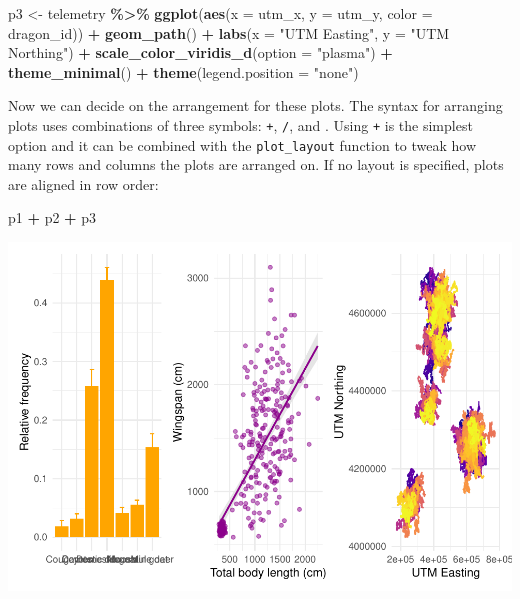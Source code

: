\documentclass[
]{book}
\newenvironment{Shaded}{\begin{snugshade}}{\end{snugshade}}
\newcommand{\AttributeTok}[1]{\textcolor[rgb]{0.13,0.29,0.53}{#1}}
\newcommand{\FunctionTok}[1]{\textcolor[rgb]{0.13,0.29,0.53}{\textbf{#1}}}
\newcommand{\NormalTok}[1]{#1}
\newcommand{\OtherTok}[1]{\textcolor[rgb]{0.56,0.35,0.01}{#1}}
\newcommand{\SpecialCharTok}[1]{\textcolor[rgb]{0.81,0.36,0.00}{\textbf{#1}}}
\newcommand{\StringTok}[1]{\textcolor[rgb]{0.31,0.60,0.02}{#1}}
\begin{document}
\begin{Shaded}
\begin{Highlighting}[]
\NormalTok{p3 }\OtherTok{\textless{}{-}}\NormalTok{ telemetry }\SpecialCharTok{\%\textgreater{}\%} 
  \FunctionTok{ggplot}\NormalTok{(}\FunctionTok{aes}\NormalTok{(}\AttributeTok{x =}\NormalTok{ utm\_x, }\AttributeTok{y =}\NormalTok{ utm\_y, }\AttributeTok{color =}\NormalTok{ dragon\_id)) }\SpecialCharTok{+}
  \FunctionTok{geom\_path}\NormalTok{() }\SpecialCharTok{+}
  \FunctionTok{labs}\NormalTok{(}\AttributeTok{x =} \StringTok{"UTM Easting"}\NormalTok{, }\AttributeTok{y =} \StringTok{"UTM Northing"}\NormalTok{) }\SpecialCharTok{+}
  \FunctionTok{scale\_color\_viridis\_d}\NormalTok{(}\AttributeTok{option =} \StringTok{"plasma"}\NormalTok{) }\SpecialCharTok{+}
  \FunctionTok{theme\_minimal}\NormalTok{() }\SpecialCharTok{+}
  \FunctionTok{theme}\NormalTok{(}\AttributeTok{legend.position =} \StringTok{"none"}\NormalTok{)}
\end{Highlighting}
\end{Shaded}

Now we can decide on the arrangement for these plots. The syntax for arranging
plots uses combinations of three symbols: \texttt{+}, \texttt{/}, and \texttt{\textbar{}}. Using \texttt{+} is the
simplest option and it can be combined with the \texttt{plot\_layout} function to tweak
how many rows and columns the plots are arranged on. If no layout is specified,
plots are aligned in row order:

\begin{Shaded}
\begin{Highlighting}[]
\NormalTok{p1 }\SpecialCharTok{+}\NormalTok{ p2 }\SpecialCharTok{+}\NormalTok{ p3 }
\end{Highlighting}
\end{Shaded}

\includegraphics{reproducible-science_files/figure-latex/gg35-1.pdf}
\end{document}
